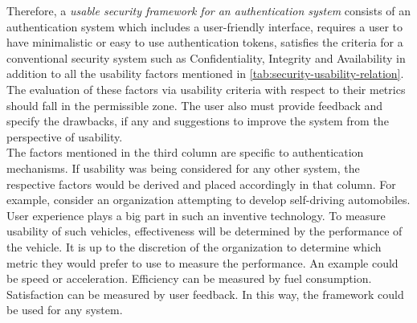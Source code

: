 Therefore, a \textit{usable security framework for an authentication system} consists of an authentication system which includes a user-friendly interface, requires a user to have minimalistic or easy to use authentication tokens, satisfies the criteria for a conventional security system such as Confidentiality, Integrity and Availability in addition to all the usability factors mentioned in \ref{tab:security-usability-relation}. The evaluation of these factors via usability criteria with respect to their metrics should fall in the permissible zone. The user also must provide feedback and specify the drawbacks, if any and suggestions to improve the system from the perspective of usability. \\
The factors mentioned in the third column are specific to authentication mechanisms. If usability was being considered for any other system, the respective factors would be derived and placed accordingly in that column. For example, consider an organization attempting to develop self-driving automobiles. User experience plays a big part in such an inventive technology. To measure usability of such vehicles, effectiveness will be determined by the performance of the vehicle. It is up to the discretion of the organization to determine which metric they would prefer to use to measure the performance. An example could be speed or acceleration. Efficiency can be measured by fuel consumption. Satisfaction can be measured by user feedback. In this way, the framework could be used for any system.

